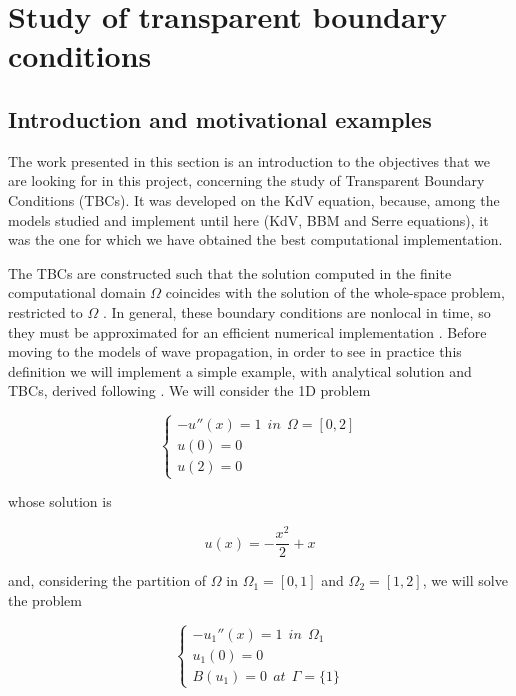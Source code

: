 \section{Study of transparent boundary conditions}
\label{sec:TBC}

\subsection{Introduction and motivational examples}

\indent The work presented in this section is an introduction to the objectives that we are looking for in this project, concerning the study of Transparent Boundary Conditions (TBCs). It was developed on the KdV equation, because, among the models studied and implement until here (KdV, BBM and Serre equations), it was the one for which we have obtained the best computational implementation.

\indent The TBCs are constructed such that the solution computed in the finite computational domain $\Omega$ coincides with the solution of the whole-space problem, restricted to $\Omega$ . In general, these boundary conditions are nonlocal in time,  so they must be approximated for an efficient numerical implementation \cite{Xavieretal2008}. Before moving to the models of wave propagation, in order to see in practice this definition we will implement a simple example, with analytical solution and TBCs, derived following \cite{Japhet2003}.  We will consider the 1D problem 

\begin{equation}
\begin{cases}
-u''(x) = 1 \ \ in \ \ \Omega = [0,2]\\
u(0) = 0 \\
u(2) = 0
\end{cases}
\end{equation}

\noindent whose solution is

$$u(x) = -\frac{x^2}{2} + x$$

\noindent and, considering the partition of $\Omega$ in $\Omega_1 = [0,1]$ and $\Omega_2 = [1,2]$, we will solve the problem

\begin{equation}
\begin{cases}
-u_1''(x) = 1 \ \ in \ \ \Omega_1\\
u_1(0) = 0 \\
B(u_1) = 0 \ \ at \ \ \Gamma=\{1\}
\end{cases}
\end{equation}

